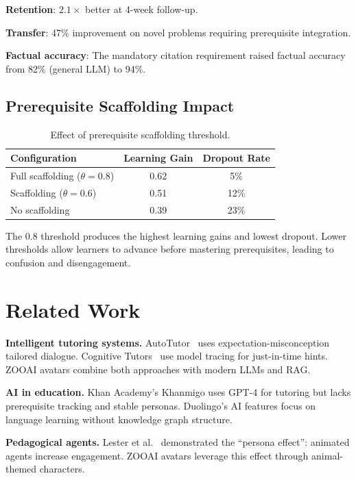 \documentclass[11pt,letterpaper]{article}
\begin{document}
\textbf{Retention}: $2.1\times$ better at 4-week follow-up.

\textbf{Transfer}: 47\% improvement on novel problems requiring prerequisite integration.

\textbf{Factual accuracy}: The mandatory citation requirement raised factual accuracy from 82\% (general LLM) to 94\%.

\subsection{Prerequisite Scaffolding Impact}

\begin{table}[t]
\centering
\begin{tabular}{lcc}
\toprule
\textbf{Configuration} & \textbf{Learning Gain} & \textbf{Dropout Rate} \\
\midrule
Full scaffolding ($\theta = 0.8$) & 0.62 & 5\% \\
Scaffolding ($\theta = 0.6$) & 0.51 & 12\% \\
No scaffolding & 0.39 & 23\% \\
\bottomrule
\end{tabular}
\caption{Effect of prerequisite scaffolding threshold.}
\label{tab:scaffold}
\end{table}

The 0.8 threshold produces the highest learning gains and lowest dropout. Lower thresholds allow learners to advance before mastering prerequisites, leading to confusion and disengagement.

\section{Related Work}

\textbf{Intelligent tutoring systems.} AutoTutor~\cite{graesser2004autotutor} uses expectation-misconception tailored dialogue. Cognitive Tutors~\cite{anderson1995cognitive} use model tracing for just-in-time hints. ZOOAI avatars combine both approaches with modern LLMs and RAG.

\textbf{AI in education.} Khan Academy's Khanmigo uses GPT-4 for tutoring but lacks prerequisite tracking and stable personas. Duolingo's AI features focus on language learning without knowledge graph structure.

\textbf{Pedagogical agents.} Lester et al.~\cite{lester1997persona} demonstrated the ``persona effect'': animated agents increase engagement. ZOOAI avatars leverage this effect through animal-themed characters.
\end{document}
